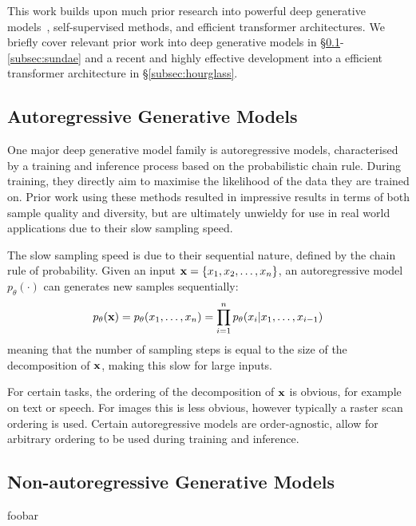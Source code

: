 This work builds upon much prior research into powerful deep generative
models~\cite{bondtaylor2021review}, self-supervised methods, and efficient
transformer architectures. We briefly cover relevant prior work into deep
generative models in \S\ref{subsec:agm}-\ref{subsec:sundae} and a recent and
highly effective development into a efficient transformer architecture in
\S\ref{subsec:hourglass}.

\subsection{Autoregressive Generative Models}
\label{subsec:agm}
One major deep generative model family is autoregressive models, characterised
by a training and inference process based on the probabilistic chain rule.
During training, they directly aim to maximise the likelihood of the data they
are trained on. Prior work using these methods resulted in impressive results in
terms of both sample quality and diversity, but are ultimately unwieldy for use
in real world applications due to their slow sampling speed.

The slow sampling speed is due to their sequential nature, defined by the chain
rule of probability. Given an input $\mathbf{x} = \{ x_{1}, x_{2}, \dots,
x_{n} \}$, an autoregressive model $p_\theta(\cdot)$ can generates new
samples sequentially:
\begin{equation}\label{eq:ar}
    p_\theta(\mathbf{x}) = p_\theta(x_{1}, \dots, x_{n}) =
    \prod\limits^{n}_{i=1} p_\theta(x_{i} \vert x_{1}, \dots, x_{i-1})
\end{equation}
meaning that the number of sampling steps is equal to the size of the
decomposition of $\mathbf{x}$, making this slow for large inputs.

For certain tasks, the ordering of the decomposition of $\mathbf{x}$ is obvious, for
example on text or speech. For images this is less obvious, however typically a
raster scan ordering is used. Certain autoregressive models are order-agnostic,
allow for arbitrary ordering to be used during training and inference.

\subsection{Non-autoregressive Generative Models}
\label{subsec:nagm}
foobar


